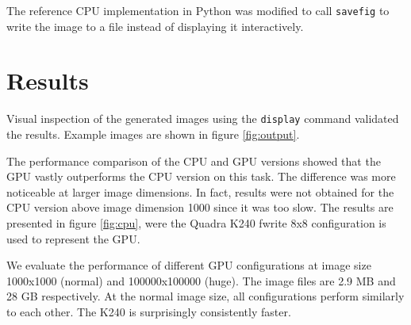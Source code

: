 \documentclass{article}
\begin{document}
The reference CPU implementation in Python was modified to call \verb|savefig|
to write the image to a file instead of displaying it interactively.

\section{Results}

Visual inspection of the generated images using the \verb|display| command
validated the results. Example images are shown in figure \ref{fig:output}.

The performance comparison of the CPU and GPU versions showed that the GPU
vastly outperforms the CPU version on this task. The difference was more
noticeable at larger image dimensions. In fact, results were not obtained for
the CPU version above image dimension 1000 since it was too slow. The results
are presented in figure \ref{fig:cpu}, were the Quadra K240 fwrite 8x8
configuration is used to represent the GPU.

We evaluate the performance of different GPU configurations at image size
1000x1000 (normal) and 100000x100000 (huge). The image files are 2.9 MB and 28
GB respectively. At the normal image size, all
configurations perform similarly to each other. The K240 is surprisingly
consistently faster.
\end{document}
